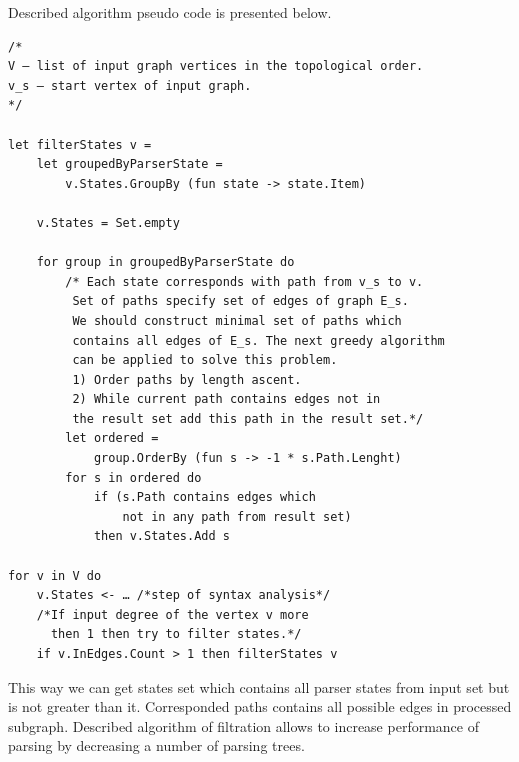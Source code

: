 Described algorithm pseudo code is presented below.
\begin{verbatim}
/*
V – list of input graph vertices in the topological order.
v_s – start vertex of input graph.
*/

let filterStates v =
    let groupedByParserState =
        v.States.GroupBy (fun state -> state.Item)

    v.States = Set.empty

    for group in groupedByParserState do
        /* Each state corresponds with path from v_s to v.
         Set of paths specify set of edges of graph E_s.
         We should construct minimal set of paths which
         contains all edges of E_s. The next greedy algorithm
         can be applied to solve this problem.
         1) Order paths by length ascent.
         2) While current path contains edges not in
         the result set add this path in the result set.*/
        let ordered = 
            group.OrderBy (fun s -> -1 * s.Path.Lenght)
        for s in ordered do
            if (s.Path contains edges which 
                not in any path from result set) 
            then v.States.Add s

for v in V do
    v.States <- … /*step of syntax analysis*/
    /*If input degree of the vertex v more 
      then 1 then try to filter states.*/
    if v.InEdges.Count > 1 then filterStates v

\end{verbatim}

This way we can get states set which contains all parser states from input set but is not greater 
than it. Corresponded paths contains all possible edges in processed subgraph. Described algorithm
of filtration allows to increase performance of parsing by decreasing a number of parsing trees.
